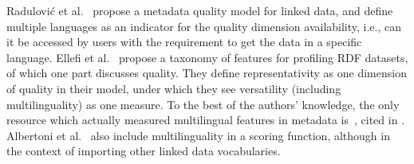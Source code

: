 Radulovi\'c et al.~\cite{radulovic2017} propose a metadata quality model for linked data, and define multiple languages as an indicator for the quality dimension availability, i.e., can it be accessed by users with the requirement to get the data in a specific language. Ellefi et al.~\cite{ellefi2017} propose a taxonomy of features for profiling RDF datasets, of which one part discusses quality. %
They define representativity as one dimension of quality in their model, under which they see versatility (including multilinguality) as one measure.
To the best of the authors' knowledge, the only resource which actually measured multilingual features in metadata is~\cite{vogias2013}, cited in \cite{palavitsinis2014}. %
Albertoni et al.~\cite{albertoni2015} also include multilinguality in a scoring function, although in the context of importing other linked data vocabularies. %

